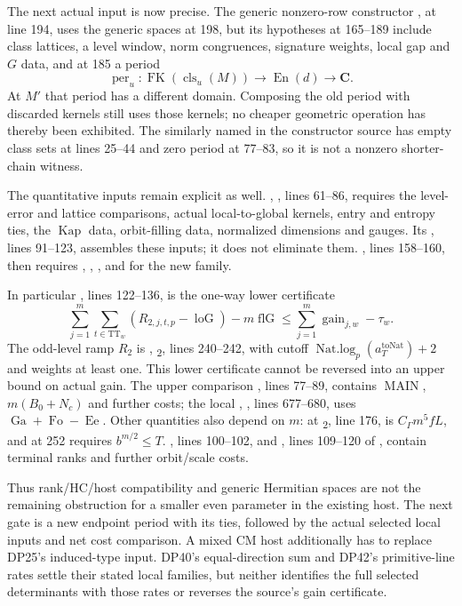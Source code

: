 The next actual input is now precise. The generic nonzero-row constructor
,  at line 194, uses the generic spaces at 198, but its hypotheses at 165--189 include class lattices, a level window, norm congruences, signature weights, local gap and $G$ data, and at 185 a period
\[
 \operatorname{per}_u:\operatorname{FK}(\operatorname{cls}_u(M))
        \longrightarrow\operatorname{En}(d)\longrightarrow\mathbf C.
\]
At $M'$ that period has a different domain. Composing the old period with discarded kernels still uses those kernels; no cheaper geometric operation has thereby been exhibited. The similarly named  in the constructor source has empty class sets at lines 25--44 and zero period at 77--83, so it is not a nonzero shorter-chain witness.

The quantitative inputs remain explicit as well.
, , lines 61--86, requires the level-error and lattice comparisons, actual local-to-global kernels, entry and entropy ties, the $\operatorname{Kap}$ data, orbit-filling data, normalized dimensions and gauges. Its , lines 91--123, assembles these inputs; it does not eliminate them. , lines 158--160, then requires , , ,  and  for the new family.

In particular , lines 122--136, is the one-way lower certificate
\[
 \sum_{j=1}^m\sum_{t\in\mathrm{TT}_w}
       (R_{2,j,t,p}-\operatorname{loG})-m\operatorname{flG}
 \le\sum_{j=1}^m\operatorname{gain}_{j,w}-\tau_w.
\]
The odd-level ramp $R_2$ is ,
\textsubscript{2}, lines 240--242, with cutoff
$\operatorname{Nat.log}_p(a_T^{\mathrm{toNat}})+2$ and weights at least one. This lower certificate cannot be reversed into an upper bound on actual gain.
The upper comparison , lines 77--89, contains
$\operatorname{MAIN}$, $m(B_0+N_c)$ and further costs; the local
, , lines 677--680, uses
$\operatorname{Ga}+\operatorname{Fo}-\operatorname{Ee}$.
Other quantities also depend on $m$:  at
\textsubscript{2}, line 176, is
$C_\Gamma m^5fL$, and  at 252 requires $b^{m/2}\le T$.
, lines 100--102, and , lines 109--120 of
, contain terminal ranks and further orbit/scale costs.

Thus rank/HC/host compatibility and generic Hermitian spaces are not the remaining obstruction for a smaller even parameter in the existing host. The next gate is a new endpoint period with its ties, followed by the actual selected local inputs and net cost comparison. A mixed CM host additionally has to replace DP25's induced-type input. DP40's equal-direction sum and DP42's primitive-line rates settle their stated local families, but neither identifies the full selected determinants with those rates or reverses the source's gain certificate.

